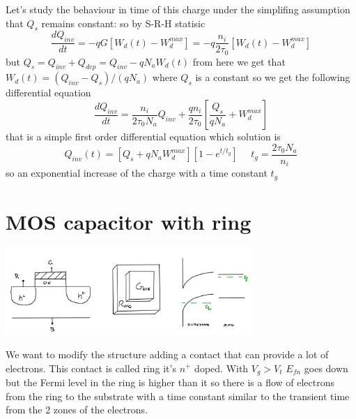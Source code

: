 Let's study the behaviour in time of this charge under the simplifing assumption that $Q_s$ remains constant: so by S-R-H statisic 
\begin{equation}
\frac{dQ_{inv}}{dt}=-qG[W_d(t)-W_d^{max}]=-q \frac{n_i}{2\tau_0}[W_d(t)-W_d^{max}]
\end{equation}
but $Q_s=Q_{inv}+Q_{dep}=Q_{inv}-qN_aW_d(t)$ from here we get that $W_d(t)=(Q_{inv}-Q_s)/(qN_a)$ where $Q_s$ is a constant so we get the following differential equation
\begin{equation}
\frac{dQ_{inv}}{dt}=\frac{n_i}{2\tau_0N_a}Q_{inv}+\frac{qn_i}{2\tau_0}[\frac{Q_s}{qN_a}+W_d^{max}]
\end{equation}
that is a simple first order differential equation which solution is
\begin{equation}
Q_{inv}(t)=[Q_s+qN_aW_d^{max}][1-e^{t/t_g}] \ \ \ \ \ \ t_g=\frac{2\tau_0N_a}{n_i}
\end{equation}
so an exponential increase of the charge with a time constant $t_g$


\section{MOS capacitor with ring}
\centering
\includegraphics[width=0.7\textwidth]{ring.png}\\
\raggedright
We want to modify the structure adding a contact that can provide a lot of electrons. This contact is called ring it's $n^+$ doped. With $V_g>V_t$ $E_{fn}$ goes down but the Fermi level in the ring is higher than it so there is a flow of electrons from the ring to the substrate with a time constant similar to the transient time from the 2 zones of the electrons.\\

